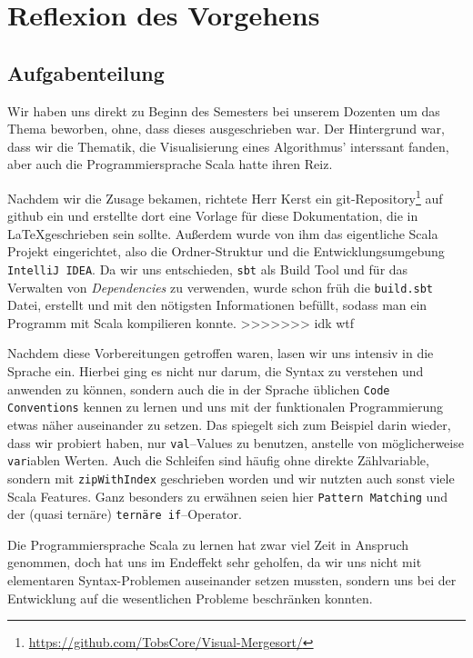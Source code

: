 \section{Reflexion des Vorgehens}\label{sec:reflexion}
\subsection{Aufgabenteilung}
Wir haben uns direkt zu Beginn des Semesters bei unserem Dozenten um das Thema beworben, ohne, dass dieses ausgeschrieben war. Der Hintergrund war, dass wir die Thematik, die Visualisierung eines Algorithmus' interssant fanden, aber auch die Programmiersprache Scala hatte ihren Reiz.

Nachdem wir die Zusage bekamen, richtete Herr Kerst ein git-Repository\footnote{\url{https://github.com/TobsCore/Visual-Mergesort/}} auf github ein und erstellte dort eine Vorlage für diese Dokumentation, die in \LaTeX geschrieben sein sollte. Außerdem wurde von ihm das eigentliche Scala Projekt eingerichtet, also die Ordner-Struktur und die Entwicklungsumgebung \texttt{IntelliJ IDEA}. Da wir uns entschieden, \texttt{sbt} als Build Tool und für das Verwalten von \textit{Dependencies} zu verwenden, wurde schon früh die \texttt{build.sbt} Datei, erstellt und mit den nötigsten Informationen befüllt, sodass man ein Programm mit Scala kompilieren konnte.
>>>>>>> idk wtf

Nachdem diese Vorbereitungen getroffen waren, lasen wir uns intensiv in die Sprache ein. Hierbei ging es nicht nur darum, die Syntax zu verstehen und anwenden zu können, sondern auch die in der Sprache üblichen \texttt{Code Conventions} kennen zu lernen und uns mit der funktionalen Programmierung etwas näher auseinander zu setzen. Das spiegelt sich zum Beispiel darin wieder, dass wir probiert haben, nur \texttt{val}--Values zu benutzen, anstelle von möglicherweise \texttt{var}iablen Werten. Auch die Schleifen sind häufig ohne direkte Zählvariable, sondern mit \texttt{zipWithIndex} geschrieben worden und wir nutzten auch sonst viele Scala Features. Ganz besonders zu erwähnen seien hier \texttt{Pattern Matching} und der (quasi ternäre) \texttt{ternäre if}--Operator.

Die Programmiersprache Scala zu lernen hat zwar viel Zeit in Anspruch genommen, doch hat uns im Endeffekt sehr geholfen, da wir uns nicht mit elementaren Syntax-Problemen auseinander setzen mussten, sondern uns bei der Entwicklung auf die wesentlichen Probleme beschränken konnten.

